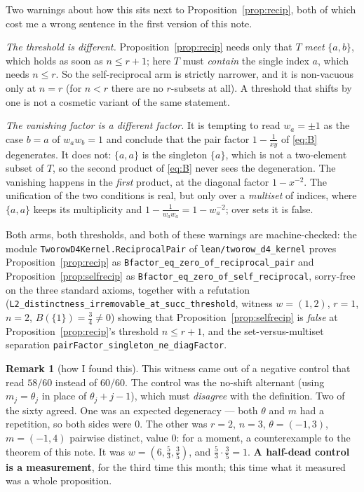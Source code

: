 \documentclass[11pt]{article}
\theoremstyle{definition}
\newtheorem{remark}[theorem]{Remark}
\begin{document}
\noindent Two warnings about how this sits next to Proposition~\ref{prop:recip}, both of
which cost me a wrong sentence in the first version of this note.

\emph{The threshold is different.} Proposition~\ref{prop:recip} needs only that $T$
\emph{meet} $\{a,b\}$, which holds as soon as $n\le r+1$; here $T$ must \emph{contain} the
single index $a$, which needs $n\le r$. So the self-reciprocal arm is strictly narrower,
and it is non-vacuous only at $n=r$ (for $n<r$ there are no $r$-subsets at all). A
threshold that shifts by one is not a cosmetic variant of the same statement.

\emph{The vanishing factor is a different factor.} It is tempting to read $w_a=\pm1$ as
the case $b=a$ of $w_aw_b=1$ and conclude that the pair factor $1-\frac1{xy}$ of
\eqref{eq:B} degenerates. It does not: $\{a,a\}$ is the singleton $\{a\}$, which is not a
two-element subset of $T$, so the second product of \eqref{eq:B} never sees the
degeneration. The vanishing happens in the \emph{first} product, at the diagonal factor
$1-x^{-2}$. The unification of the two conditions is real, but only over a
\emph{multiset} of indices, where $\{a,a\}$ keeps its multiplicity and
$1-\frac1{w_aw_a}=1-w_a^{-2}$; over sets it is false.

Both arms, both thresholds, and both of these warnings are machine-checked: the module
\texttt{TworowD4Kernel.ReciprocalPair} of \texttt{lean/tworow\_d4\_kernel} proves
Proposition~\ref{prop:recip} as \texttt{Bfactor\_eq\_zero\_of\_reciprocal\_pair} and
Proposition~\ref{prop:selfrecip} as \texttt{Bfactor\_eq\_zero\_of\_self\_reciprocal},
sorry-free on the three standard axioms, together with a refutation
(\texttt{L2\_distinctness\_irremovable\_at\_succ\_threshold}, witness $w=(1,2)$, $r=1$,
$n=2$, $B(\{1\})=\tfrac34\ne0$) showing that Proposition~\ref{prop:selfrecip} is
\emph{false} at Proposition~\ref{prop:recip}'s threshold $n\le r+1$, and the
set-versus-multiset separation \texttt{pairFactor\_singleton\_ne\_diagFactor}.

\begin{remark}[how I found this]\label{rem:howfound}
This witness came out of a negative control that read $58/60$ instead of $60/60$. The
control was the no-shift alternant (using $m_j=\theta_j$ in place of $\theta_j+j-1$), which
must \emph{disagree} with the definition. Two of the sixty agreed. One was an expected
degeneracy --- both $\theta$ and $m$ had a repetition, so both sides were $0$. The other
was $r=2$, $n=3$, $\theta=(-1,3)$, $m=(-1,4)$ pairwise distinct, value $0$: for a moment, a
counterexample to the theorem of this note. It was $w=(6,\tfrac53,\tfrac35)$, and
$\tfrac53\cdot\tfrac35=1$. \textbf{A half-dead control is a measurement}, for the third
time this month; this time what it measured was a whole proposition.
\end{remark}
\end{document}
